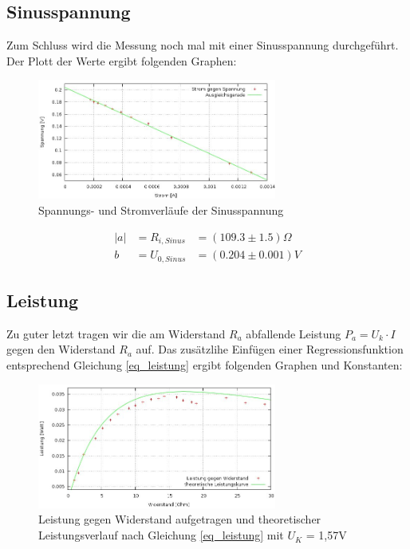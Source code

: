 \subsection{Sinusspannung}
Zum Schluss wird die Messung noch mal mit einer Sinusspannung durchgeführt. Der Plott der Werte ergibt folgenden Graphen:
\begin{figure}[H]
\includegraphics[width=0.7\textwidth]{pics/sinus.jpeg}
\caption{Spannungs- und Stromverläufe der Sinusspannung}
\end{figure}
\begin{align*}
|a| &= R_{i,Sinus}   &= (109.3    \pm 1.5) \Omega\\
b &= U_{0, Sinus} &= (0.204 \pm 0.001) V
\end{align*}

\subsection{Leistung}
Zu guter letzt tragen wir die am Widerstand $R_a$ abfallende Leistung $P_a = U_k \cdot I$ gegen den Widerstand $R_a$ auf. Das zusätzlihe Einfügen einer Regressionsfunktion entsprechend Gleichung \ref{eq_leistung} ergibt folgenden Graphen und Konstanten:

\begin{figure}[htbp]
\includegraphics[width=0.7\textwidth]{pics/leistung.jpeg}
\caption{Leistung gegen Widerstand aufgetragen und theoretischer Leistungsverlauf nach Gleichung \eqref{eq_leistung} mit $U_K$ = 1,57V}
\label{pic_leistung}
\end{figure}

